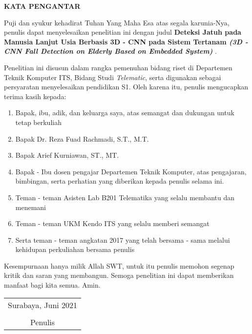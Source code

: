 \begin{center}
\Large\textbf{KATA PENGANTAR}
\end{center}
\vspace{1ex}

\setlength{\parindent}{0.9cm} Puji dan syukur kehadirat Tuhan Yang Maha Esa atas segala karunia-Nya, penulis  dapat menyelesaikan penelitian ini dengan judul \textbf{Deteksi Jatuh pada Manusia Lanjut Usia Berbasis 3D - CNN pada Sistem Tertanam \textit{(3D - CNN Fall Detection on Elderly Based on Embedded System)}
}.
\vspace{1ex}

Penelitian ini disusun dalam rangka pemenuhan bidang riset di Departemen Teknik Komputer ITS, Bidang  Studi \textit{Telematic}, serta digunakan sebagai persyaratan menyelesaikan pendidikan  S1. Oleh karena itu, penulis mengucapkan terima kasih kepada:
\vspace{1ex}

\begin{enumerate}[nolistsep]
  \item Bapak, ibu, adik, dan keluarga saya, atas semangat dan dukungan untuk tetap berkuliah
  \item Bapak Dr. Reza Fuad Rachmadi, S.T., M.T.
  \item Bapak Arief Kurniawan, ST., MT.
  \item Bapak - Ibu dosen pengajar Departemen Teknik Komputer, atas pengajaran, bimbingan, serta perhatian yang diberikan kepada penulis selama ini.
  \item Teman - teman Asisten Lab B201 Telematika yang selalu membantu dan menemani
  \item Teman - teman UKM Kendo ITS yang selalu memberi semangat
  \item Serta teman - teman angkatan 2017 yang telah bersama - sama melalui kehidupan perkuliahan bersama penulis
\end{enumerate}
\vspace{1ex}

Kesempurnaan hanya milik Allah SWT, untuk itu penulis memohon segenap kritik dan saran yang  membangun. Semoga penelitian ini dapat memberikan manfaat bagi kita semua. Amin.
\begin{flushright}
\begin{tabular}[b]{c}
  Surabaya, Juni 2021
  \\
  \\
  Penulis
\end{tabular}
\end{flushright}